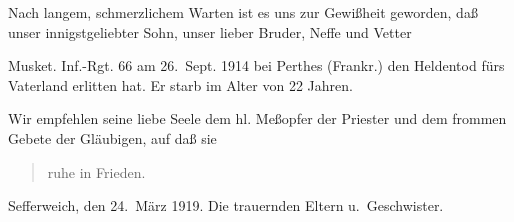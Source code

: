 

\pstart
Nach langem, schmerzlichem Warten ist\ob
es uns zur Gewißheit geworden, daß\ob
unser innigstgeliebter Sohn, unser lieber Bruder, Neffe und Vetter

\pend
{}
\pstart

Musket. Inf.-Rgt. 66\ob
am 26.\ Sept. 1914 bei Perthes (Frankr.)\ob
den Heldentod fürs Vaterland erlitten hat.\ob
Er starb im Alter von 22 Jahren.

Wir empfehlen seine liebe Seele dem\ob
hl. Meßopfer der Priester und dem frommen\ob
Gebete der Gläubigen, auf daß sie

\pend
\begin{verse}
ruhe in Frieden.
\end{verse}
\pstart
Sefferweich, den 24.\ März 1919.\ob
Die trauernden Eltern u.\ Geschwister.
\pend
